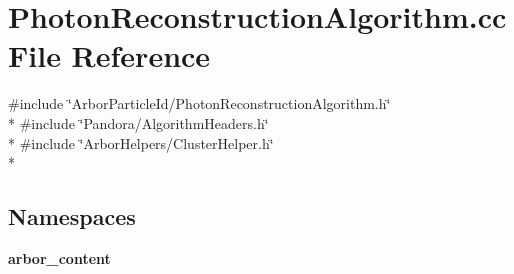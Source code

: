 \section{Photon\+Reconstruction\+Algorithm.\+cc File Reference}
\label{PhotonReconstructionAlgorithm_8cc}
{\ttfamily \#include \char`\"{}Arbor\+Particle\+Id/\+Photon\+Reconstruction\+Algorithm.\+h\char`\"{}}\\*
{\ttfamily \#include \char`\"{}Pandora/\+Algorithm\+Headers.\+h\char`\"{}}\\*
{\ttfamily \#include \char`\"{}Arbor\+Helpers/\+Cluster\+Helper.\+h\char`\"{}}\\*
\subsection*{Namespaces}
\begin{DoxyCompactItemize}
\item 
 {\bf arbor\+\_\+content}
\end{DoxyCompactItemize}
